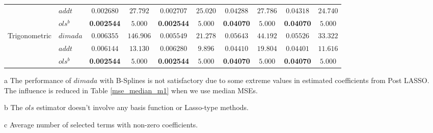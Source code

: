 \documentclass[12pt, a4paper]{article}
\theoremstyle{MAstyle} \newtheorem{assumption}{Assumption}[section]
\theoremstyle{MAstyle} \newtheorem{definition}{Definition}[section]
\theoremstyle{MAstyle} \newtheorem{theorem}{Theorem}[section]
\theoremstyle{MAstyle} \newtheorem{corollary}{Corollary}[section]
\begin{document}
\begin{table}[!htbp]
{\begin{threeparttable}
\begin{tabular}{llcccccccc}
                        & $addt$ & $0.002680$ & $27.792$ & $0.002707$ & $25.020$ & $0.04288$ & $27.786$ & $0.04318$ & $24.740$ \\
                        & $ols^b$ & \textbf{0.002544} & $5.000$ & \textbf{0.002544} & $5.000$ & \textbf{0.04070} & $5.000$ & \textbf{0.04070} & $5.000$ \\
                       Trigonometric & $dimada$ & $0.006355$ & $146.906$ & $0.005549$ & $21.278$ & $0.05643$ & $44.192$ & $0.05526$ & $33.322$ \\
                        & $addt$ & $0.006144$ & $13.130$ & $0.006280$ & $9.896$ & $0.04410$ & $19.804$ & $0.04401$ & $11.616$ \\
                        & $ols^b$ & \textbf{0.002544} & $5.000$ & \textbf{0.002544} & $5.000$ & \textbf{0.04070} & $5.000$ & \textbf{0.04070} & $5.000$ \\
                        \hline 
                        \hline
                    \end{tabular}
                    \begin{tablenotes}
                        \footnotesize   %
                        \item[a] The performance of $dimada$ with B-Splines is not satisfactory due to some extreme values in estimated coefficients from Post LASSO. The influence is reduced in Table \ref{mse_median_m1} when we use median MSEs. 
                        \item [b] The $ols$ estimator doesn't involve any basis function or Lasso-type methods.
                        \item [c] Average number of selected terms with non-zero coefficients.
                    \end{tablenotes}
                    \end{threeparttable}
                    }
                \end{table} 
\end{document}
